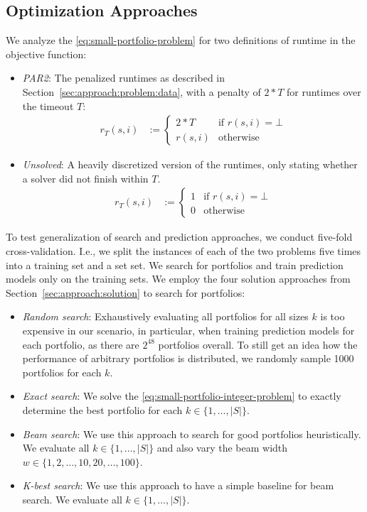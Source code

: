 \documentclass[conference]{IEEEtran}
\begin{document}
\subsection{Optimization Approaches}

We analyze the \ref{eq:small-portfolio-problem} for two definitions of runtime in the objective function:

\begin{itemize}
	\item \emph{PAR2}:
	The penalized runtimes as described in Section~\ref{sec:approach:problem:data}, with a penalty of $2*T$ for runtimes over the timeout $T$:
	\begin{align*}
		r_T(s,i) &:= \begin{cases}
			2*T & \text{if }r(s,i) = \bot\\
			r(s,i) & \text{otherwise}
		\end{cases}
	\end{align*}
	\item \emph{Unsolved}:
	A heavily discretized version of the runtimes, only stating whether a solver did not finish within $T$.
	\begin{align*}
		r_T(s,i) &:= \begin{cases}
			1 & \text{if }r(s,i) = \bot\\
			0 & \text{otherwise}
		\end{cases}
	\end{align*}
\end{itemize}

To test generalization of search and prediction approaches, we conduct five-fold cross-validation.
I.e., we split the instances of each of the two problems five times into a training set and a set set.
We search for portfolios and train prediction models only on the training sets.
We employ the four solution approaches from Section~\ref{sec:approach:solution} to search for portfolios:

\begin{itemize}
	\item \emph{Random search}:
	Exhaustively evaluating all portfolios for all sizes $k$ is too expensive in our scenario, in particular, when training prediction models for each portfolio, as there are $2^{48}$ portfolios overall.
	To still get an idea how the performance of arbitrary portfolios is distributed, we randomly sample 1000 portfolios for each $k$.
	\item \emph{Exact search}:
	We solve the \ref{eq:small-portfolio-integer-problem} to exactly determine the best portfolio for each $k \in \{1, \dots, |S|\}$.
	\item \emph{Beam search}:
	We use this approach to search for good portfolios heuristically.
	We evaluate all $k \in \{1, \dots, |S|\}$ and also vary the beam width $w \in \{1, 2, \dots, 10, 20, \dots, 100\}$.
	\item \emph{K-best search}:
	We use this approach to have a simple baseline for beam search.
	We evaluate all $k \in \{1, \dots, |S|\}$.
\end{itemize}
\end{document}
